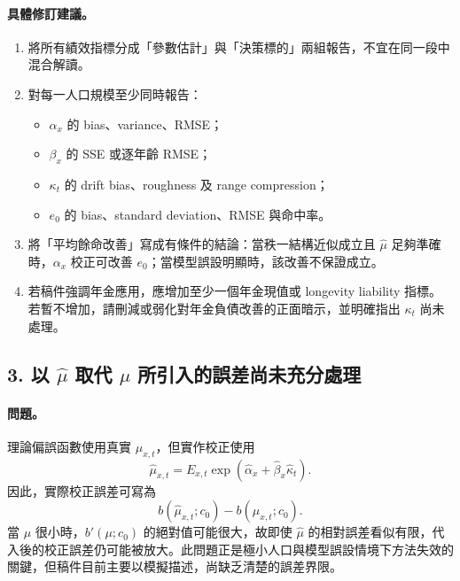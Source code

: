 \documentclass[12pt,a4paper]{article}
\begin{document}
\paragraph{具體修訂建議。}
\begin{enumerate}
  \item 將所有績效指標分成「參數估計」與「決策標的」兩組報告，不宜在同一段中混合解讀。
  \item 對每一人口規模至少同時報告：
  \begin{itemize}
    \item $\alpha_x$ 的 bias、variance、RMSE；
    \item $\beta_x$ 的 SSE 或逐年齡 RMSE；
    \item $\kappa_t$ 的 drift bias、roughness 及 range compression；
    \item $e_0$ 的 bias、standard deviation、RMSE 與命中率。
  \end{itemize}
  \item 將「平均餘命改善」寫成有條件的結論：當秩一結構近似成立且 $\widehat\mu$ 足夠準確時，$\alpha_x$ 校正可改善 $e_0$；當模型誤設明顯時，該改善不保證成立。
  \item 若稿件強調年金應用，應增加至少一個年金現值或 longevity liability 指標。若暫不增加，請刪減或弱化對年金負債改善的正面暗示，並明確指出 $\kappa_t$ 尚未處理。
\end{enumerate}

\subsection*{3. 以 $\widehat\mu$ 取代 $\mu$ 所引入的誤差尚未充分處理}

\paragraph{問題。}
理論偏誤函數使用真實 $\mu_{x,t}$，但實作校正使用
\[
\widehat\mu_{x,t}=E_{x,t}\exp(\widehat\alpha_x+\widehat\beta_x\widehat\kappa_t).
\]
因此，實際校正誤差可寫為
\[
b(\widehat\mu_{x,t};c_0)-b(\mu_{x,t};c_0).
\]
當 $\mu$ 很小時，$b'(\mu;c_0)$ 的絕對值可能很大，故即使 $\widehat\mu$ 的相對誤差看似有限，代入後的校正誤差仍可能被放大。此問題正是極小人口與模型誤設情境下方法失效的關鍵，但稿件目前主要以模擬描述，尚缺乏清楚的誤差界限。
\end{document}
